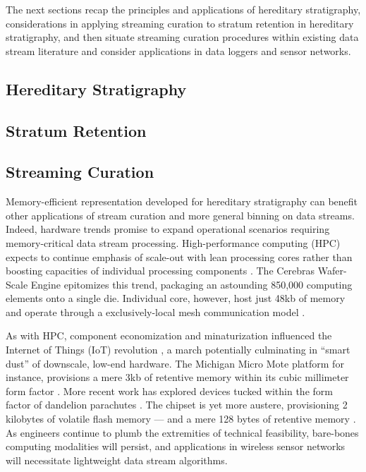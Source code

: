 The next sections recap the principles and applications of hereditary stratigraphy, considerations in applying streaming curation to stratum retention in hereditary stratigraphy, and then situate streaming curation procedures within existing data stream literature and consider applications in data loggers and sensor networks.

\subsection{Hereditary Stratigraphy}

\subsection{Stratum Retention}

\subsection{Streaming Curation}

Memory-efficient representation developed for hereditary stratigraphy can benefit other applications of stream curation and more general binning on data streams.
Indeed, hardware trends promise to expand operational scenarios requiring memory-critical data stream processing.
High-performance computing (HPC) expects to continue emphasis of scale-out with lean processing cores rather than boosting capacities of individual processing components \citep{sutter2005free,morgenstern2021unparalleled}.
The Cerebras Wafer-Scale Engine epitomizes this trend, packaging an astounding 850,000 computing elements onto a single die.
Individual core, however, host just 48kb of memory and operate through a exclusively-local mesh communication model \citep{cerebras2021wafer,lauterbach2021path}.

As with HPC, component economization and minaturization influenced the Internet of Things (IoT) revolution \citep{rfc7228,ojo2018review}, a march potentially culminating in ``smart dust'' \citep{warneke2001smart} of downscale, low-end hardware.
The Michigan Micro Mote platform for instance, provisions a mere 3kb of retentive memory within its cubic millimeter form factor \citep{lee2012modular}.
More recent work has explored devices tucked within the form factor of dandelion parachutes \citep{iyer2022wind}.
The chipset is yet more austere, provisioning 2 kilobytes of volatile flash memory --- and a mere 128 bytes of retentive memory \citep{microchip2014atiny20}.
As engineers continue to plumb the extremities of technical feasibility, bare-bones computing modalities will persist, and applications in wireless sensor networks will necessitate lightweight data stream algorithms.

